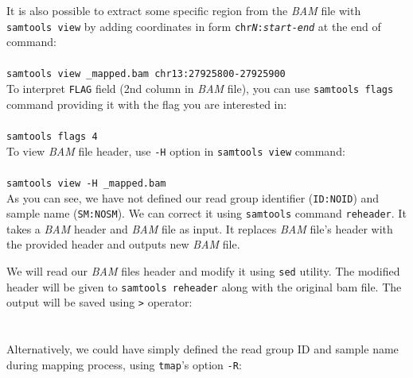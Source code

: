 It is also possible to extract some specific region from the \textit{BAM} file with \texttt{samtools view}
by adding coordinates in form \texttt{chr\textit{N}:\textit{start}-\textit{end}} at the end of command:\\~\\
\texttt{samtools view \mapReads\_mapped.bam chr13:27925800-27925900}\\

To interpret \texttt{FLAG} field (2nd column in \textit{BAM} file), you
can use \texttt{samtools flags} command providing it with the flag you are interested in:\\~\\
\texttt{samtools flags 4}\\

To view \textit{BAM} file header, use 
\texttt{-H} option in \texttt{samtools view} command:\\~\\
\texttt{samtools view -H \mapReads\_mapped.bam}\\

As you can see, we have not defined our read group identifier (\texttt{ID:NOID})
and sample name (\texttt{SM:NOSM}). We can correct it using \texttt{samtools}
command \texttt{reheader}. It takes a \textit{BAM} header and \textit{BAM} file
as input. It replaces \textit{BAM} file's header with the provided header and 
outputs new \textit{BAM} file.

We will read our \textit{BAM} files header and modify it using \texttt{sed}
utility. The modified header will be given to \texttt{samtools reheader}
along with the original bam file. The output will be saved using \texttt{>}
operator:\\~\\
\\

Alternatively, we could have simply defined the read group ID and sample name during mapping process,
using \texttt{tmap}'s option \texttt{-R}:\\~\\%
\\


